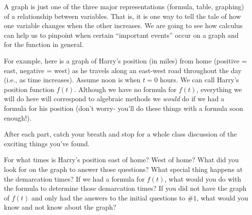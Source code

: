 \documentclass{ximera}
\begin{document}
A graph is just one of the three major representations (formula, table, graphing) of a relationship between variables.  That is, it is one way to tell the tale of how one variable changes when the other increases.  We are going to see how calculus can help us to pinpoint when certain ``important events'' occur on a graph and for the function in general.

For example, here is a graph of Harry's position (in miles) from home (positive = east, negative = west) as he travels along an east-west road throughout the day (i.e., as time increases).  Assume noon is when $t = 0$ hours.  We can call Harry's position function $f(t)$. Although we have no formula for $f(t)$, everything we will do here will correspond to algebraic methods we {\em would} do if we had a formula for his position (don't worry- you'll do these things with a formula soon enough!). 

        After each part, catch your breath and stop for a whole class discussion of the exciting things you've found.

\begin{image}
\end{image}


\begin{exploration}
For what times is Harry's position east of home?  West of home?  What did you look for on the graph to answer those questions?  What special thing happens at the demarcation times?  If we had a formula for $f(t)$, what would you do with the formula to determine those demarcation times?  If you did not have the graph of $f(t)$ and only had the answers to the initial questions to $\#1$, what would you know and not know about the graph?

\end{exploration}
\end{document}
